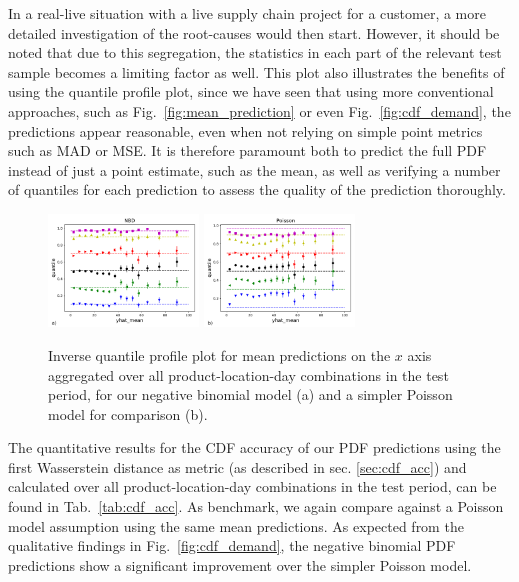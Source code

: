 \documentclass[BCOR=1mm, DIV=calc,10pt,
twoside=true,
twocolumn,
headings=normal]{scrartcl}
\newcommand{\fig}{Fig.~}
\newcommand{\tab}{Tab.~}
\begin{document}
\noindent
In a real-live situation with a live supply chain project for a customer, a more detailed investigation of the root-causes would then start. However, it should be noted that due to this segregation, the statistics in each part of the relevant test sample becomes a limiting factor as well. This plot also illustrates the benefits of using the quantile profile plot, since we have seen that using more conventional approaches, such as \fig \ref{fig:mean_prediction} or even \fig \ref{fig:cdf_demand}, the predictions appear reasonable, even when not relying on simple point metrics such as MAD or MSE. It is therefore paramount both to predict the full PDF instead of just a point estimate, such as the mean, as well as verifying a number of quantiles for each prediction to assess the quality of the prediction thoroughly.

\begin{figure}
\begin{center}
\includegraphics[width=4cm]{invquant_yhat_mean_nbinom}
\includegraphics[width=4cm]{invquant_yhat_mean_poisson}
\caption{\label{fig:invquant_mean} Inverse quantile profile plot for mean predictions on the $x$ axis aggregated over all product-location-day combinations in the test period, for our negative binomial model (a) and a simpler Poisson model for comparison (b).}
\end{center}
\end{figure}

The quantitative results for the CDF accuracy of our PDF predictions using the first Wasserstein distance as metric (as described in sec. \ref{sec:cdf_acc}) and calculated over all product-location-day combinations in the test period, can be found in \tab \ref{tab:cdf_acc}. As benchmark, we again compare against a Poisson model assumption using the same mean predictions. As expected from the qualitative findings in \fig \ref{fig:cdf_demand}, the negative binomial PDF predictions show a significant improvement over the simpler Poisson model.
\end{document}
